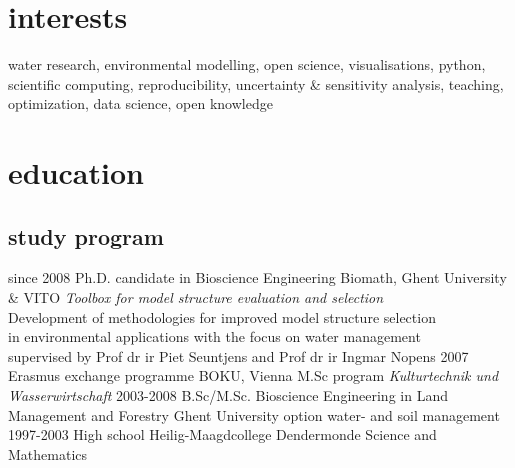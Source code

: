 \documentclass[]{stvhoey-cv}  %
\begin{document}
\section{interests}
water research, environmental modelling, open science, visualisations, python, scientific computing, reproducibility, uncertainty \& sensitivity analysis, teaching, optimization, data science, open knowledge \vspace{\baselineskip}

\section{education}
\subsection*{study program}
\begin{entrylist}
  \entry
    {since 2008}
    {Ph.D. {\normalfont candidate in Bioscience Engineering}}
    {Biomath, Ghent University \& VITO}
    {\emph{Toolbox for model structure evaluation and selection}\\
    Development of methodologies for improved model structure selection\\ in environmental applications with the focus on water management\\ \small{supervised by Prof dr ir Piet Seuntjens and Prof dr ir Ingmar Nopens}}
  \entry
    {2007}
    {Erasmus exchange programme}
    {BOKU, Vienna}
    {M.Sc program \textit{Kulturtechnik und Wasserwirtschaft}}
  \entry
    {2003-2008}
    {B.Sc/M.Sc. Bioscience Engineering in Land Management and Forestry}
    {Ghent University}
    {option water- and soil management}
  \entry
    {1997-2003}
    {High school}
    {Heilig-Maagdcollege Dendermonde}
    {Science and Mathematics}
\end{entrylist}
\end{document}
